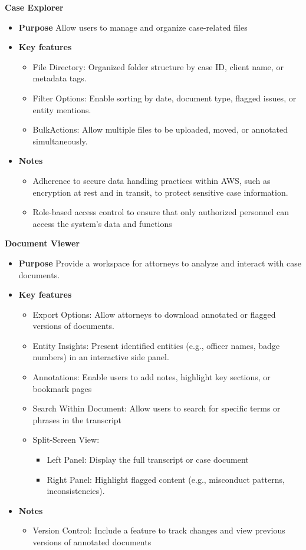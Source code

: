 \documentclass[12pt]{article}
\begin{document}
\textbf{  Case Explorer}
\begin{itemize}
  \item \textbf{Purpose} Allow users to manage and organize case-related files
  \item \textbf{Key features}   
	\begin{itemize}
		\item   File Directory: Organized folder structure by case ID, client name, or metadata tags.
		\item Filter Options: Enable sorting by date, document type, flagged issues, or entity mentions.
		\item  BulkActions: Allow multiple files to be uploaded, moved, or annotated simultaneously.
	\end{itemize}
  \item \textbf{Notes}   
	\begin{itemize}
		\item    Adherence to secure data handling practices within AWS, such as encryption at rest and in transit, to protect sensitive case information.
		\item Role-based access control to ensure that only authorized personnel can access the system’s data and functions
	\end{itemize}

\end{itemize}

\textbf{ Document Viewer}
\begin{itemize}
  \item \textbf{Purpose}  Provide a workspace for attorneys to analyze and interact with case documents.
  \item \textbf{Key features}   
	\begin{itemize}
		\item  Export Options: Allow attorneys to download annotated or flagged versions of documents.
		\item Entity Insights: Present identified entities (e.g., officer names, badge numbers) in an interactive side panel.
		\item Annotations: Enable users to add notes, highlight key sections, or bookmark pages
		\item   Search Within Document: Allow users to search for specific terms or phrases in the transcript
		\item Split-Screen View:
		\begin{itemize}
			\item     Left Panel: Display the full transcript or case document
			\item Right Panel: Highlight flagged content (e.g., misconduct patterns, inconsistencies).
		\end{itemize}
	\end{itemize}
  \item \textbf{Notes}   
	\begin{itemize}
		\item    Version Control: Include a feature to track changes and view previous versions of annotated documents
	\end{itemize}
\end{itemize}
\end{document}
